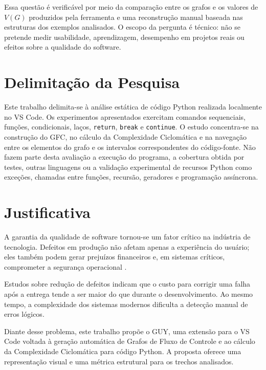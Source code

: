 Essa questão é verificável por meio da comparação entre os grafos e os valores de $V(G)$ produzidos pela ferramenta e uma reconstrução manual baseada nas estruturas dos exemplos analisados. O escopo da pergunta é técnico: não se pretende medir usabilidade, aprendizagem, desempenho em projetos reais ou efeitos sobre a qualidade do software.


\section{Delimitação da Pesquisa}
\label{sec:delimitacao_pesquisa}

Este trabalho delimita-se à análise estática de código Python realizada localmente no VS Code. Os experimentos apresentados exercitam comandos sequenciais, funções, condicionais, laços, \texttt{return}, \texttt{break} e \texttt{continue}. O estudo concentra-se na construção do GFC, no cálculo da Complexidade Ciclomática e na navegação entre os elementos do grafo e os intervalos correspondentes do código-fonte. Não fazem parte desta avaliação a execução do programa, a cobertura obtida por testes, outras linguagens ou a validação experimental de recursos Python como exceções, chamadas entre funções, recursão, geradores e programação assíncrona.



\section{Justificativa}

A garantia da qualidade de software tornou-se um fator crítico na indústria de tecnologia. Defeitos em produção não afetam apenas a experiência do usuário; eles também podem gerar prejuízos financeiros e, em sistemas críticos, comprometer a segurança operacional .

\pagebreak

Estudos sobre redução de defeitos indicam que o custo para corrigir uma falha após a entrega tende a ser maior do que durante o desenvolvimento. Ao mesmo tempo, a complexidade dos sistemas modernos dificulta a detecção manual de erros lógicos.

Diante desse problema, este trabalho propõe o GUY, uma extensão para o VS Code voltada à geração automática de Grafos de Fluxo de Controle e ao cálculo da Complexidade Ciclomática para código Python. A proposta oferece uma representação visual e uma métrica estrutural para os trechos analisados.


